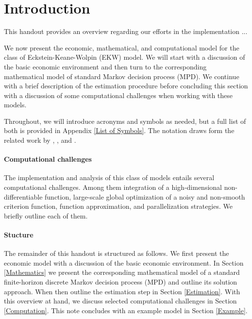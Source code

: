 \section{Introduction}
This handout provides an overview regarding our efforts in the implementation ...

We now present the economic, mathematical, and computational model for the class of Eckstein-Keane-Wolpin (EKW) model. We will start with a discussion of the basic economic environment and then turn to the corresponding mathematical model of standard Markov decision process (MPD). We continue with a brief description of the estimation procedure before concluding this section with a discussion of some computational challenges when working with these models.

Throughout, we will introduce acronyms and symbols as needed, but a full list of both is provided in Appendix \ref{List of Symbols}. The notation draws form the related work by \cite{Puterman.1994}, \cite{Aguirregabiria.2010}, and \cite{Arcidiacono.2011}.

\paragraph{Computational challenges} The implementation and analysis of this class of models entails several computational challenges. Among them integration of a high-dimensional non-differentiable function, large-scale global optimization of a noisy and non-smooth criterion function, function approximation, and parallelization strategies. We briefly outline each of them.

\paragraph{Stucture} The remainder of this handout is structured as follows. We first present the economic model with a discussion of the basic economic environment. In Section \ref{Mathematics} we present the corresponding mathematical model of a standard finite-horizon discrete Markov decision process (MPD) and outline its solution approach. When then outline the estimation step in Section \ref{Estimation}. With this overview at hand, we discuss selected computational challenges in Section \ref{Computation}. This note concludes with an example model in Section \ref{Example}.

